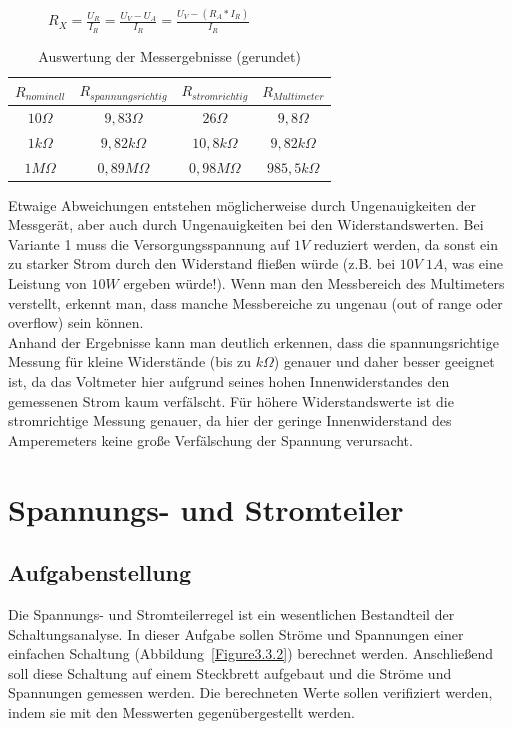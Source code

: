 \documentclass[12pt,a4paper,titlepage]{article}
\begin{document}
\begin{figure}[H]
  \centering
  \label{Figure2.5.6}
  $R_X = \frac{U_R}{I_R} = \frac{U_V-U_A}{I_R} = \frac{U_V-(R_A*I_R)}{I_R}$
\end{figure}

\begin{table}[H]
  \centering
  \label{Figure2.5.7}
  \begin{tabular}{|c|c|c|c|}
    \hline
    $R_{nominell}$ & $R_{spannungsrichtig}$ & $R_{stromrichtig}$ & $R_{Multimeter}$ \\
    \hline
    $10\Omega$ & $9,83\Omega$ & $26\Omega$ & $9,8\Omega$ \\
    \hline
    $1k\Omega$ & $9,82k\Omega$ & $10,8k\Omega$ & $9,82k\Omega$ \\
    \hline
    $1M\Omega$ & $0,89M\Omega$ & $0,98M\Omega$ & $985,5k\Omega$ \\
    \hline
  \end{tabular}
  \caption{Auswertung der Messergebnisse (gerundet)}
\end{table}

\noindent Etwaige Abweichungen entstehen möglicherweise durch Ungenauigkeiten der Messgerät, aber auch durch Ungenauigkeiten bei den Widerstandswerten. Bei Variante 1 muss die Versorgungsspannung auf $1V$ reduziert werden, da sonst ein zu starker Strom durch den Widerstand fließen würde (z.B. bei $10V\;1A$, was eine Leistung von $10W$ ergeben würde!). Wenn man den Messbereich des Multimeters verstellt, erkennt man, dass manche Messbereiche zu ungenau (out of range oder overflow) sein können.\\
Anhand der Ergebnisse kann man deutlich erkennen, dass die spannungsrichtige Messung für kleine Widerstände (bis zu $k\Omega$) genauer und daher besser geeignet ist, da das Voltmeter hier aufgrund seines hohen Innenwiderstandes den gemessenen Strom kaum verfälscht. Für höhere Widerstandswerte ist die stromrichtige Messung genauer, da hier der geringe Innenwiderstand des Amperemeters keine große Verfälschung der Spannung verursacht.



\newpage
\section{Spannungs- und Stromteiler}

\subsection{Aufgabenstellung}
Die Spannungs- und Stromteilerregel ist ein wesentlichen Bestandteil der Schaltungsanalyse. In dieser Aufgabe sollen Str\"ome und Spannungen einer einfachen Schaltung (Abbildung~\ref{Figure3.3.2}) berechnet werden. Anschlie\ss end soll diese Schaltung auf einem Steckbrett aufgebaut und die Str\"ome und Spannungen gemessen werden. Die berechneten Werte sollen verifiziert werden, indem sie mit den Messwerten gegen\"ubergestellt werden.
\end{document}
